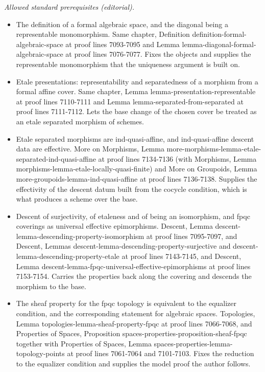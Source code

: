 \documentclass{stacks-project}
\theoremstyle{plain}
\theoremstyle{definition}
\theoremstyle{remark}
\numberwithin{equation}{subsection}
\begin{document}
\noindent\textit{Allowed standard prerequisites (editorial).}\begin{itemize}
\item The definition of a formal algebraic space, and the diagonal being a representable monomorphism. Same chapter, Definition definition-formal-algebraic-space at proof lines 7093-7095 and Lemma lemma-diagonal-formal-algebraic-space at proof lines 7076-7077. Fixes the objects and supplies the representable monomorphism that the uniqueness argument is built on.
\item Etale presentations: representability and separatedness of a morphism from a formal affine cover. Same chapter, Lemma lemma-presentation-representable at proof lines 7110-7111 and Lemma lemma-separated-from-separated at proof lines 7111-7112. Lets the base change of the chosen cover be treated as an etale separated morphism of schemes.
\item Etale separated morphisms are ind-quasi-affine, and ind-quasi-affine descent data are effective. More on Morphisms, Lemma more-morphisms-lemma-etale-separated-ind-quasi-affine at proof lines 7134-7136 (with Morphisms, Lemma morphisms-lemma-etale-locally-quasi-finite) and More on Groupoids, Lemma more-groupoids-lemma-ind-quasi-affine at proof lines 7136-7138. Supplies the effectivity of the descent datum built from the cocycle condition, which is what produces a scheme over the base.
\item Descent of surjectivity, of etaleness and of being an isomorphism, and fpqc coverings as universal effective epimorphisms. Descent, Lemma descent-lemma-descending-property-isomorphism at proof lines 7095-7097, and Descent, Lemmas descent-lemma-descending-property-surjective and descent-lemma-descending-property-etale at proof lines 7143-7145, and Descent, Lemma descent-lemma-fpqc-universal-effective-epimorphisms at proof lines 7153-7154. Carries the properties back along the covering and descends the morphism to the base.
\item The sheaf property for the fpqc topology is equivalent to the equalizer condition, and the corresponding statement for algebraic spaces. Topologies, Lemma topologies-lemma-sheaf-property-fpqc at proof lines 7066-7068, and Properties of Spaces, Proposition spaces-properties-proposition-sheaf-fpqc together with Properties of Spaces, Lemma spaces-properties-lemma-topology-points at proof lines 7061-7064 and 7101-7103. Fixes the reduction to the equalizer condition and supplies the model proof the author follows.
\end{itemize}\medskip
\end{document}
